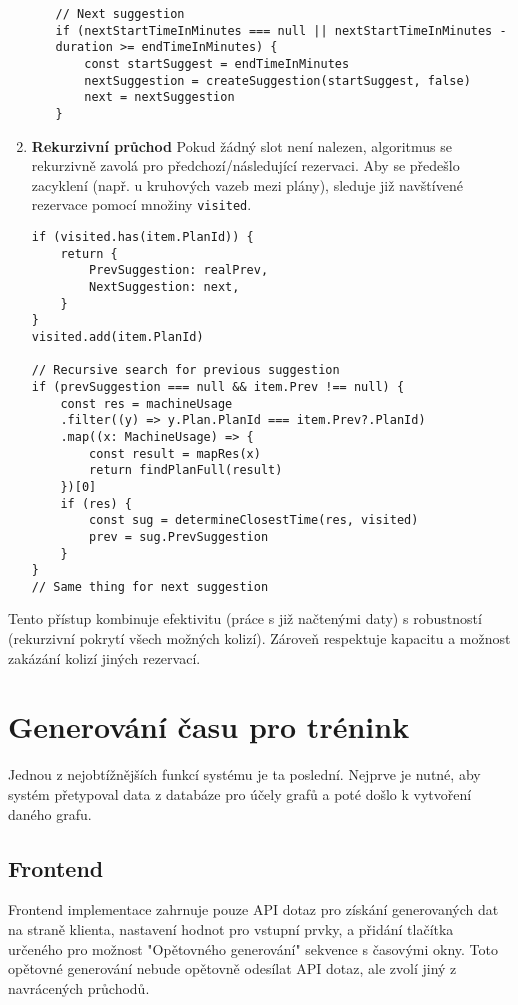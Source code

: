 \begin{enumerate}
\begin{itemize}
\begin{lstlisting}
// Next suggestion
if (nextStartTimeInMinutes === null || nextStartTimeInMinutes - duration >= endTimeInMinutes) {
    const startSuggest = endTimeInMinutes
    nextSuggestion = createSuggestion(startSuggest, false)
    next = nextSuggestion
}
    \end{lstlisting}
    \end{itemize}

    \item \textbf{Rekurzivní průchod}
    Pokud žádný slot není nalezen, algoritmus se rekurzivně zavolá pro předchozí/následující rezervaci. Aby se předešlo zacyklení (např. u kruhových vazeb mezi plány), sleduje již navštívené rezervace pomocí množiny \texttt{visited}.

    \begin{lstlisting}
if (visited.has(item.PlanId)) {
    return {
	    PrevSuggestion: realPrev,
	    NextSuggestion: next,
    }
}
visited.add(item.PlanId)

// Recursive search for previous suggestion
if (prevSuggestion === null && item.Prev !== null) {
    const res = machineUsage
	.filter((y) => y.Plan.PlanId === item.Prev?.PlanId)
	.map((x: MachineUsage) => {
	    const result = mapRes(x)
	    return findPlanFull(result)
	})[0]
    if (res) {
	    const sug = determineClosestTime(res, visited)
	    prev = sug.PrevSuggestion
    }
}
// Same thing for next suggestion
    \end{lstlisting}
\end{enumerate}

Tento přístup kombinuje efektivitu (práce s již načtenými daty) s robustností (rekurzivní pokrytí všech možných kolizí). Zároveň respektuje kapacitu a možnost zakázání kolizí jiných rezervací.

\section{Generování času pro trénink}
Jednou z nejobtížnějších funkcí systému je ta poslední. Nejprve je nutné, aby systém přetypoval data z databáze pro účely grafů a poté došlo k vytvoření daného grafu.

\subsection{Frontend}
Frontend implementace zahrnuje pouze API dotaz pro získání generovaných dat na straně klienta, nastavení hodnot pro vstupní prvky, a přidání tlačítka určeného pro možnost "Opětovného generování" sekvence s časovými okny. Toto opětovné generování nebude opětovně odesílat API dotaz, ale zvolí jiný z navrácených průchodů.

